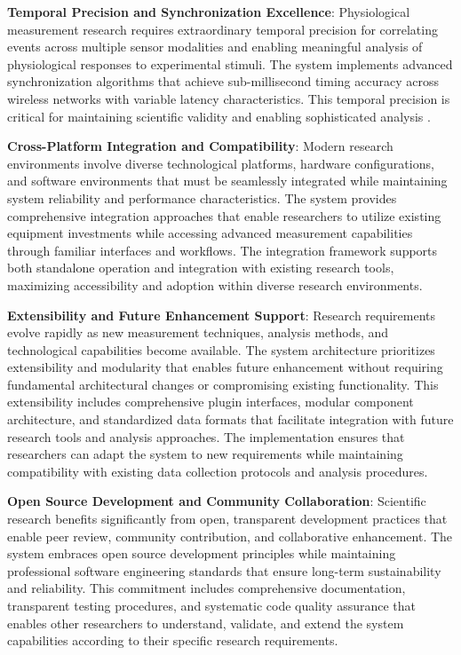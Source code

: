 \documentclass[11pt,a4paper]{article}
\begin{document}
\textbf{Temporal Precision and Synchronization Excellence}: Physiological measurement research requires extraordinary
temporal precision for correlating events across multiple sensor modalities and enabling meaningful analysis of
physiological responses to experimental stimuli. The system implements advanced synchronization algorithms that achieve
sub-millisecond timing accuracy across wireless networks with variable latency characteristics. This temporal precision
is critical for maintaining scientific validity and enabling sophisticated
analysis \cite{Fischer1985}.

\textbf{Cross-Platform Integration and Compatibility}: Modern research environments involve diverse technological
platforms, hardware configurations, and software environments that must be seamlessly integrated while maintaining
system reliability and performance characteristics. The system provides comprehensive integration approaches that enable
researchers to utilize existing equipment investments while accessing advanced measurement capabilities through familiar
interfaces and workflows. The integration framework supports both standalone operation and integration with existing
research tools, maximizing accessibility and adoption within diverse research
environments.

\textbf{Extensibility and Future Enhancement Support}: Research requirements evolve rapidly as new measurement
techniques, analysis methods, and technological capabilities become available. The system architecture prioritizes
extensibility and modularity that enables future enhancement without requiring fundamental architectural changes or
compromising existing functionality. This extensibility includes comprehensive plugin interfaces, modular component
architecture, and standardized data formats that facilitate integration with future research tools and analysis
approaches. The implementation ensures that researchers can adapt the system to new requirements while maintaining
compatibility with existing data collection protocols and analysis
procedures.

\textbf{Open Source Development and Community Collaboration}: Scientific research benefits significantly from open,
transparent development practices that enable peer review, community contribution, and collaborative enhancement. The
system embraces open source development principles while maintaining professional software engineering standards that
ensure long-term sustainability and reliability. This commitment includes comprehensive documentation, transparent
testing procedures, and systematic code quality assurance that enables other researchers to understand, validate, and
extend the system capabilities according to their specific research
requirements.
\end{document}
